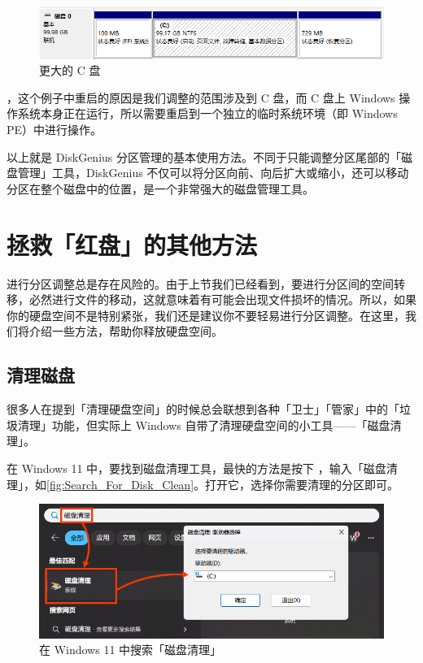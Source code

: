 {\begin{figure}[htb!]
  \centering
  \includegraphics[width=.8\textwidth]{assets/advanced/Larger_C.png}
  \caption{更大的 C 盘}
  \label{fig:Larger_C}
\end{figure}

\begin{note}
  ，这个例子中重启的原因是我们调整的范围涉及到 C 盘，而 C 盘上 Windows 操作系统本身正在运行，所以需要重启到一个独立的临时系统环境（即 Windows PE）中进行操作。
\end{note}

以上就是 DiskGenius 分区管理的基本使用方法。不同于只能调整分区尾部的「磁盘管理」工具，DiskGenius 不仅可以将分区向前、向后扩大或缩小，还可以移动分区在整个磁盘中的位置，是一个非常强大的磁盘管理工具。

\section{拯救「红盘」的其他方法}

进行分区调整总是存在风险的。由于上节我们已经看到，要进行分区间的空间转移，必然进行文件的移动，这就意味着有可能会出现文件损坏的情况。所以，如果你的硬盘空间不是特别紧张，我们还是建议你不要轻易进行分区调整。在这里，我们将介绍一些方法，帮助你释放硬盘空间。

\subsection{清理磁盘}

很多人在提到「清理硬盘空间」的时候总会联想到各种「卫士」「管家」中的「垃圾清理」功能，但实际上 Windows 自带了清理硬盘空间的小工具——「磁盘清理」。

在 Windows 11 中，要找到磁盘清理工具，最快的方法是按下 ，输入「磁盘清理」，如\autoref{fig:Search_For_Disk_Clean}。打开它，选择你需要清理的分区即可。

\begin{figure}[htb!]
  \centering
  \includegraphics[width=.72\textwidth]{assets/advanced/Search_For_Disk_Clean.jpg}
  \caption{在 Windows 11 中搜索「磁盘清理」}
  \label{fig:Search_For_Disk_Clean}
\end{figure}

}
